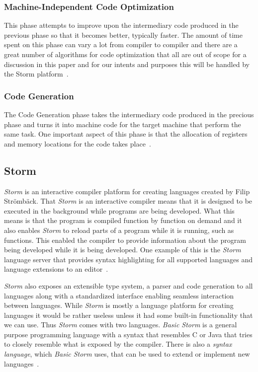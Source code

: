 \documentclass{sigchi}
\begin{document}
\subsubsection{Machine-Independent Code Optimization}
This phase attempts to improve upon the intermediary code produced in the previous phase so that it becomes better, typically faster. The amount of time spent on this phase can vary a lot from compiler to compiler and there are a great number of algorithms for code optimization that all are out of scope for a discussion in this paper and for our intents and purposes this will be handled by the Storm platform~\cite{dragon}.

\subsubsection{Code Generation}
The Code Generation phase takes the intermediary code produced in the precious phase and turns it into machine code for the target machine that perform the same task. One important aspect of this phase is that the allocation of registers and memory locations for the code takes place~\cite{dragon}.

\subsection{Storm}
\emph{Storm} is an interactive compiler platform for creating languages created by Filip Strömbäck. That \emph{Storm} is an interactive compiler means that it is designed to be executed in the background while programs are being developed. What this means is that the program is compiled function by function on demand and it also enables \emph{Storm} to reload parts of a program while it is running, such as functions. This enabled the compiler to provide information about the program being developed while it is being developed. One example of this is the \emph{Storm} language server that provides syntax highlighting for all supported languages and language extensions to an editor~\cite{Storm:2023}.

\emph{Storm} also exposes an extensible type system, a parser and code generation to all languages along with a standardized interface enabling seamless interaction between languages. While \emph{Storm} is mostly a language platform for creating languages it would be rather useless unless it had some built-in functionality that we can use. Thus \emph{Storm} comes with two languages. \emph{Basic Storm} is a general purpose programming language with a syntax that resembles C or Java that tries to closely resemble what is exposed by the compiler. There is also a \emph{syntax language}, which \emph{Basic Storm} uses, that can be used to extend or implement new languages~\cite{Storm:2023}.
\end{document}
